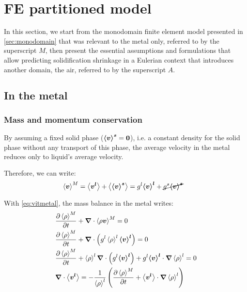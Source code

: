 
\section{FE partitioned model}
 
In this section, we start from the monodomain finite element model 
presented in \cref{sec:monodomain} that was relevant to the metal only, 
referred to by the superscript $M$, then present the essential assumptions and formulations 
that allow predicting solidification shrinkage in a Eulerian context that introduces
another domain, the air, referred to by the superscript $A$.

\subsection{In the metal}

\subsubsection{Mass and momentum conservation}

By assuming a fixed solid phase ($\boldsymbol{\left \langle v \right \rangle^s}=\boldsymbol{0}$), i.e. a constant density 
for the solid phase without any transport of this phase, 
the average velocity in the metal reduces only to liquid's average velocity. 

Therefore, we can write:
\begin{align}
\label{eq:vitmetal}
& \vM = \vit + \avg{\vs} = \gl \vl + \cancel{\gs \vs}
\end{align}

With \cref{eq:vitmetal}, the mass balance in the metal writes:
\begin{subequations}
\begin{align}
& \tempup{\avg{\rho}^M} + \nabvec \cdot \avg{\rho \vec{v}}^M  = 0 \\ 
& \tempup{\avg{\rho}^M} + \nabvec \cdot \brac{ \gl \rhol \vl} = 0 \\ 
& \tempup{\avg{\rho}^M} + \rhol \nabvec \cdot \brac{ \gl \vl} 
	+ \gl \vl \cdot  \nabvec \rhol = 0 \\	
\label{eq:mass_balance_metal}
& \nabvec \cdot \vit 
= -\frac{1}{\rhol} \brac{\tempup{\avg{\rho}^M }+ \vit \cdot  \nabvec \rhol}
\end{align}
\end{subequations}

